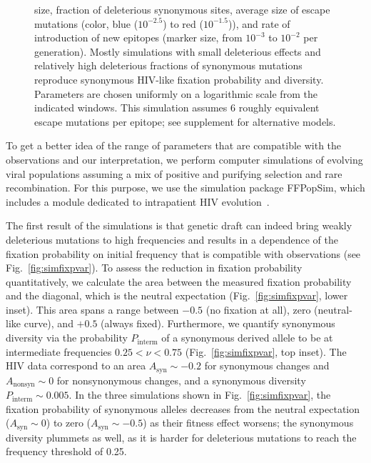 \documentclass[rmp, twocolumn]{revtex4}
\newcommand{\FIG}[1]{Fig.~\ref{fig:#1}}
\begin{document}
\begin{figure}
\begin{center}
{size, fraction of deleterious synonymous sites, average size of escape
mutations (color, blue ($10^{-2.5}$) to red ($10^{-1.5}$)), and rate of
introduction of new epitopes (marker size, from $10^{-3}$ to $10^{-2}$ per
generation). Mostly simulations with small deleterious effects and relatively
high deleterious fractions of synonymous mutations reproduce synonymous HIV-like
fixation probability and diversity. Parameters are chosen uniformly on a
logarithmic scale from the indicated windows. This simulation assumes 6
roughly equivalent escape mutations per epitope; see supplement for alternative
models.}
\label{fig:simheat}
\end{center}
\end{figure}

To get a better idea of the range of parameters that are compatible with the
observations and our interpretation, we perform computer simulations of
evolving viral populations assuming a mix of positive and purifying selection
and rare recombination.
For this purpose, we use the simulation package FFPopSim, which includes a
module dedicated to intrapatient HIV evolution~\citep{zanini_ffpopsim:_2012}. 

The first result of the simulations is that genetic draft can indeed bring weakly
deleterious mutations to high frequencies and results in a dependence of the
fixation probability on initial frequency that is compatible with observations
(see \FIG{simfixpvar}).
To assess the reduction in fixation probability quantitatively, we calculate
the area between the measured fixation probability and the diagonal, which is
the neutral expectation (\FIG{simfixpvar}, lower inset). This area spans a range
between $-0.5$ (no fixation at all), zero (neutral-like curve), and $+0.5$ (always
fixed). Furthermore, we quantify synonymous diversity via the probability
$P_\text{interm}$ of a synonymous derived allele to be at intermediate frequencies
$0.25 < \nu < 0.75$ (\FIG{simfixpvar}, top inset).
The HIV data correspond to an area $A_\text{syn} \sim -0.2$  for synonymous
changes and $A_\text{nonsyn} \sim 0$ for nonsynonymous changes,
and a synonymous diversity $P_\text{interm} \sim 0.005$.
In the three simulations shown in \FIG{simfixpvar}, the fixation probability of
synonymous alleles decreases from the neutral expectation ($A_\text{syn} \sim 0$) to zero
($A_\text{syn} \sim -0.5$) as their fitness effect
worsens; the synonymous diversity plummets as well, as it is harder for
deleterious mutations to reach the frequency threshold of 0.25.
\end{document}
